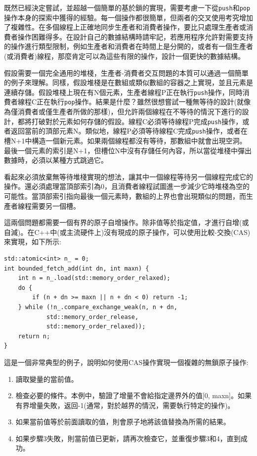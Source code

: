 
既然已經決定嘗試，並超越一個簡單的基於鎖的實現，需要考慮一下從\texttt{push}和\texttt{pop}操作本身的探索中獲得的經驗。每一個操作都很簡單，但兩者的交叉使用考究增加了複雜性。在多個線程上正確地同步生產者和消費者操作，要比只處理生產者或消費者操作困難得多。在設計自己的數據結構時請牢記，若應用程序允許對需要支持的操作進行類型限制，例如生產者和消費者在時間上是分開的，或者有一個生產者(或消費者)線程，那麼肯定可以為這些有限的操作，設計一個更快的數據結構。

假設需要一個完全通用的堆棧，生產者-消費者交互問題的本質可以通過一個簡單的例子來理解。同樣，假設堆棧是在數組或類似數組的容器之上實現，並且元素是連續存儲。假設堆棧上現在有N個元素，生產者線程P正在執行\texttt{push}操作，同時消費者線程C正在執行\texttt{pop}操作。結果是什麼？雖然很想嘗試一種無等待的設計(就像為僅消費者或僅生產者所做的那樣)，但允許兩個線程在不等待的情況下進行的設計，都將打破對於元素如何存儲的假設。線程C必須等待線程P完成\texttt{push}操作，或者返回當前的頂部元素N。類似地，線程P必須等待線程C完成\texttt{push}操作，或者在槽N+1中構造一個新元素。如果兩個線程都沒有等待，那數組中就會出現空洞。最後一個元素的索引是N+1，但槽位N中沒有存儲任何內容，所以當從堆棧中彈出數據時，必須以某種方式跳過它。

看起來必須放棄無等待堆棧實現的想法，讓其中一個線程等待另一個線程完成它的操作。還必須處理當頂部索引為0，且消費者線程試圖進一步減少它時堆棧為空的可能性。當頂部索引指向最後一個元素時，數組的上界也會出現類似的問題，而生產者線程需要另一個槽。

這兩個問題都需要一個有界的原子自增操作。除非值等於指定值，才進行自增(或自減)。在C++中(或主流硬件上)沒有現成的原子操作，可以使用比較-交換(CAS)來實現，如下所示:

\begin{lstlisting}[style=styleCXX]
std::atomic<int> n_ = 0;
int bounded_fetch_add(int dn, int maxn) {
	int n = n_.load(std::memory_order_relaxed);
	do {
		if (n + dn >= maxn || n + dn < 0) return -1;
	} while (!n_.compare_exchange_weak(n, n + dn,
			std::memory_order_release,
			std::memory_order_relaxed));
	return n;
}
\end{lstlisting}

這是一個非常典型的例子，說明如何使用CAS操作實現一個複雜的無鎖原子操作:

\begin{enumerate}
\item 讀取變量的當前值。
\item 檢查必要的條件。本例中，驗證了增量不會給指定邊界外的值[0, maxn]。如果有界增量失敗，返回-1(通常，對於越界的情況，需要執行特定的操作)。
\item 如果當前值等於前面讀取的值，則會原子地將該值替換為所需的結果。
\item 如果步驟3失敗，則當前值已更新，請再次檢查它，並重復步驟3和4，直到成功。
\end{enumerate}

